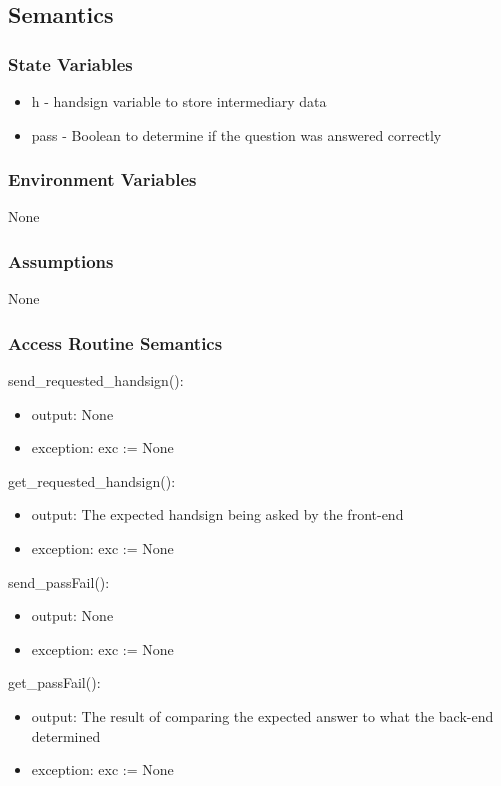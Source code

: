 \documentclass[12pt, titlepage]{article}
\begin{document}
\subsection{Semantics}
\subsubsection{State Variables}
\begin{itemize}
    \item h - handsign variable to store intermediary data
    \item pass - Boolean to determine if the question was answered correctly
\end{itemize}
\subsubsection{Environment Variables}
None
\subsubsection{Assumptions}
None
\subsubsection{Access Routine Semantics}
\noindent send\_requested\_handsign():
\begin{itemize}
\item output: None 
\item exception: exc := None
\end{itemize}

\noindent get\_requested\_handsign():
\begin{itemize}
\item output: The expected handsign being asked by the front-end
\item exception: exc := None
\end{itemize}

\noindent send\_passFail():
\begin{itemize}
\item output: None
\item exception: exc := None
\end{itemize}

\noindent get\_passFail():
\begin{itemize}
\item output: The result of comparing the expected answer to what the back-end determined
\item exception: exc := None
\end{itemize}
\end{document}
